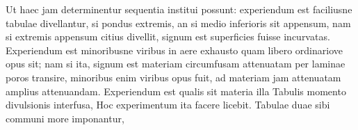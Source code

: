                      \pstart  Ut haec jam determinentur sequentia  institui possunt: experiendum  est faciliusne tabulae\protect{} divellantur, si pondus\protect{} extremis, an  si medio inferioris sit appensum, nam si extremis appensum citius  divellit, signum est superficies fuisse incurvatas.  Experiendum  est minoribusne viribus in aere exhausto quam libero ordinariove  opus sit; nam si ita, signum est materiam circumfusam  attenuatam per laminae\protect{} poros transire, minoribus enim viribus  opus fuit, ad materiam jam attenuatam amplius attenuandam.  Experiendum est qualis sit materia illa  Tabulis\protect{}  momento divulsionis interfusa,  Hoc experimentum ita facere licebit. Tabulae\protect{} duae  sibi communi more imponantur, 
